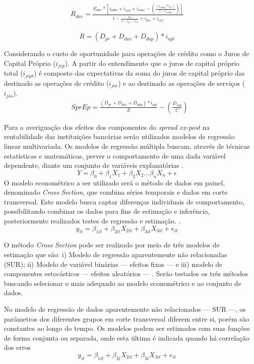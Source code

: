 \documentclass[12pt,12pt,openright,oneside,a4paper,chapter=TITLE,section=TITLE,subsection=TITLE,subsubsection=TITLE english,french,spanish,portugues,sumario=tradicional]{abntex2}
\begin{document}
\[\begin{aligned}
R_{dav} = \frac{E_{dav} * [i_{adm} + i_{ind} + i_{coav} - (\frac{(i_{comp}*i_{ac})}{1 - i_{comp}})]}{1 -  \frac{i_{ll}}{1 - i_{ir} - i_{cs}} + i_{pis} + i_{cof}}
\end{aligned}\]

\[
R = (D_{pr} + D_{dav} + D_{dap}) * i_{apl}
\]

Considerando o custo de oportunidade para operações de crédito como o Juros de Capital Próprio (\(i_{jcp}\)). A partir do entendimento que o juros de capital próprio total (\(i_{jcpt}\)) é composto das expectativas da soma do juros de capital próprio das destinado as operações de crédito (\(i_{joc}\)) e ao destinado as operações de serviços (\(i_{jos}\)).
\[\begin{aligned}
& SprEp = \frac{(D_{pr} + D_{dav} + D_{dap})* i_{apl}}{E} - (\frac{D_{cap}}{C})
\end{aligned}\]

Para a averiguação dos efeitos dos componentes do \emph{spread ex-post} na rentabilidade das instituições bancárias serão utilizados modelos de regressão linear multivariada. Os modelos de regressão múltipla buscam, através de técnicas estatísticas e matemáticas, prever o comportamento de uma dada variável dependente, diante um conjunto de variáveis explanatórias \cite{hill:2010} \cite{gareth:2017}.
\[
Y = \beta_0 + \beta_1X_1 + \beta_2X_2...\beta_nX_n + \epsilon
\]
O modelo econométrico a ser utilizado será o método de dados em painel, denominado \emph{Cross Section}, que combina séries temporais e dados em corte transversal. Este modelo busca captar diferenças individuais de comportamento, possibilitando combinar os dados para fins de estimação e inferência, posteriormente realizados testes de regressão e estimação. \cite{hill:2010}.
\[
y_{it} = \beta_{1it} + \beta_{2it}X_{2it} + \beta_{3it}X_{3it} + e_{it}
\]

O método \emph{Cross Section} pode ser realizado por meio de três modelos de estimação que são: i) Modelo de regressão aparentemente não relacionadas (SUR); ii) Modelo de variável binárias --- efeitos fixos --- e iii) modelo de componentes estocásticos --- efeitos aleatórios --- \cite{hill:2010}. Serão testados os três métodos buscando selecionar o mais adequado ao modelo econométrico e ao conjunto de dados.

No modelo de regressão de dados aparentemente não relacionados --- SUR ---, os parâmetros dos diferentes grupos em corte transversal diferem entre si, porém são constantes ao longo do tempo. Os modelos podem ser estimados com suas funções de forma conjunta ou separada, onde esta última é indicada quando há correlação dos erros \cite{hill:2010}
\[
y_{it} = \beta_{1it} + \beta_{2i}X_{2it} + \beta_{3i}X_{3it} + e_{it}
\]
\end{document}
